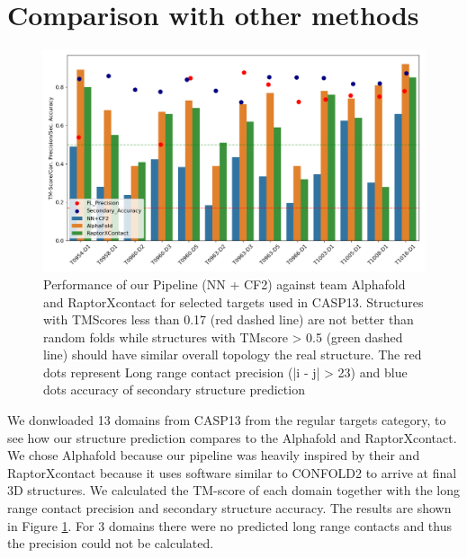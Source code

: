 \section{Comparison with other methods}

\begin{figure}
    \centering
    \includegraphics[width=\linewidth]{imgs_tomas/long_range_casp13_tm_contacts_sec.png}
    \caption{Performance of our Pipeline (NN + CF2) against team Alphafold and RaptorXcontact for selected targets used in CASP13. Structures with TMScores less than 0.17 (red dashed line) are not better than random folds while structures with TMscore > 0.5 (green dashed line) should have similar overall topology the real structure. The red dots represent Long range contact precision (|i - j| > 23) and blue dots accuracy of secondary structure prediction}
    \label{fig:casp_performance}
\end{figure}

We donwloaded 13 domains from CASP13 from the regular targets category, to see how our structure prediction compares to the Alphafold and RaptorXcontact. We chose Alphafold because our pipeline was heavily inspired by their and RaptorXcontact because it uses software similar to CONFOLD2 to arrive at final 3D structures. We calculated the TM-score of each domain together with the long range contact precision and secondary structure accuracy. The results are shown in Figure \ref{fig:casp_performance}. For 3 domains there were no predicted long range contacts and thus the precision could not be calculated.

